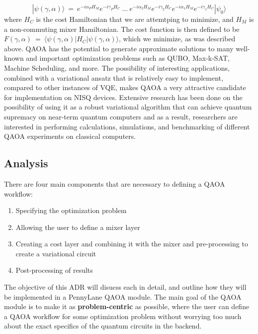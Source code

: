 \documentclass{article}
\begin{document}
$$|\psi(\gamma, \alpha)\rangle \ = \ e^{-i \alpha_P H_M} e^{-i \gamma_P H_C} \ ... \  e^{-i \alpha_2 H_M} e^{-i \gamma_2 H_C}  e^{-i \alpha_1 H_M} e^{-i \gamma_1 H_C} |\psi_0\rangle$$
\noindent
where $H_C$ is the cost Hamiltonian that we are attemtping to minimize, and $H_M$ is a non-commuting mixer Hamiltonian.
\newline\newline
\noindent
The cost function is then defined to be $F(\gamma, \alpha) \ = \ \langle \psi(\gamma, \alpha) | H_C | \psi (\gamma, \alpha) \rangle$, which 
we minimize, as was described above.
\newline\newline
\noindent
QAOA has the potential to generate approximate solutions to many well-known and important optimization problems 
such as QUBO, Max-k-SAT, Machine Scheduling, and more. The possibility of interesting applications, combined 
with a variational ansatz that is relatively easy to implement, compared to other instances of VQE, makes QAOA 
a very attractive candidate for implementation on NISQ devices. Extensive research 
has been done on the possibility of using it as a robust variational algorithm that can 
achieve quantum supremacy on near-term quantum computers and as 
a result, researchers are interested in performing calculations, simulations, and benchmarking of different 
QAOA experiments on classical computers.


\subsection{Analysis}

There are four main components that are necessary to defining a QAOA workflow:

\begin{enumerate}
	\item Specifying the optimization problem
	\item Allowing the user to define a mixer layer
	\item Creating a cost layer and combining it with the mixer and pre-processing 
	      to create a variational circuit
      	\item Post-processing of results 
\end{enumerate}
\noindent
The objective of this ADR will disucss each in detail, and outline how they will be implemented in 
a PennyLane QAOA module.
\newline\newline
The main goal of the QAOA module is to make it as \textbf{problem-centric} as possible, 
where the user can define a QAOA workflow for some optimization problem without 
worrying too much about the exact specifics of the quantum circuits in the backend.
\end{document}
